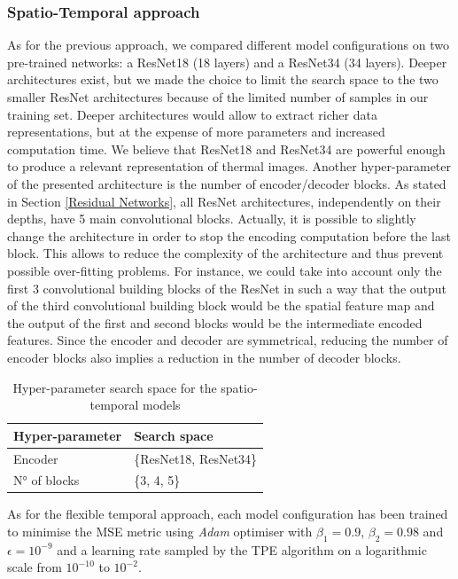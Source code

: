 \subsubsection{Spatio-Temporal approach}
As for the previous approach, we compared different model configurations on two pre-trained networks: a ResNet18 (18 layers) and a ResNet34 (34 layers). Deeper architectures exist, but we made the choice to limit the search space to the two smaller ResNet architectures because of the limited number of samples in our training set. Deeper architectures would allow to extract richer data representations, but at the expense of more parameters and increased computation time. We believe that ResNet18 and ResNet34 are powerful enough to produce a relevant representation of thermal images. Another hyper-parameter of the presented architecture is the number of encoder/decoder blocks. As stated in Section \ref{Residual Networks}, all ResNet architectures, independently on their depths, have 5 main convolutional blocks. Actually, it is possible to slightly change the architecture in order to stop the encoding computation before the last block. This allows to reduce the complexity of the architecture and thus prevent possible over-fitting problems. For instance, we could take into account only the first 3 convolutional building blocks of the ResNet in such a way that the output of the third convolutional building block would be the spatial feature map and the output of the first and second blocks would be the intermediate encoded features. Since the encoder and decoder are symmetrical, reducing the number of encoder blocks also implies a reduction in the number of decoder blocks.

\begin{table}[h!]
    \centering
    \caption{Hyper-parameter search space for the spatio-temporal models}
    \begin{tabular}{ll}
    \toprule
    \textbf{Hyper-parameter} & \textbf{Search space} \\ 
    \midrule
    Encoder & \{ResNet18, ResNet34\} \\
    N° of blocks  & \{3, 4, 5\} \\
    \bottomrule
    \end{tabular}
    \label{tab:spatial_temporal_search_space}
\end{table}

As for the flexible temporal approach, each model configuration has been trained to minimise the MSE metric using \textit{Adam} optimiser with $\beta_{1} = 0.9$, $\beta_{2} = 0.98$ and $\epsilon = 10^{-9}$ and a learning rate sampled by the TPE algorithm on a logarithmic scale from $10^{-10}$ to $10^{-2}$. 

